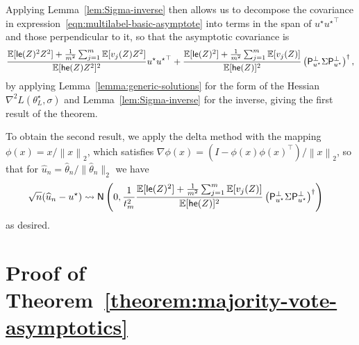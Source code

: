 \documentclass[11pt]{article}
\newcommand{\E}{\mathbb{E}}
\newcommand{\prn}[1]{\left({#1}\right)} %
\newcommand{\norm}[1]{\left\|{#1}\right\|} %
\newcommand{\what}[1]{\widehat{#1}}
\newcommand{\normal}{\mathsf{N}}
\newcommand{\proj}{\mathsf{P}}
\newcommand{\projperp}{\proj_{u\opt}^\perp}
\newcommand{\ltwo}[1]{\norm{#1}_2} %
\newcommand{\norms}[1]{\|{#1}\|} %
\newcommand{\ltwos}[1]{\norms{#1}_2} %
\newcommand{\<}{\langle} %
\renewcommand{\>}{\rangle}
\newcommand{\cd}{\rightsquigarrow}
\newcommand{\opt}{^\star}
\begin{document}
Applying Lemma~\ref{lem:Sigma-inverse} then allows us to decompose the
covariance in expression~\eqref{eqn:multilabel-basic-asymptote} into
terms in the span of $u\opt {u\opt}^\top$ and those perpendicular to
it, so that the asymptotic covariance is
\begin{align*}
	\frac{\E[\linkerr(Z)^2 Z^2] + \frac{1}{m^2}
		\sum_{j = 1}^m \E[v_j(Z) Z^2]}{
		\E[\hessfunc(Z) Z^2]^2} u\opt {u\opt}^\top
	+ \frac{\E[\linkerr(Z)^2] + \frac{1}{m^2}
		\sum_{j = 1}^m \E[v_j(Z)]}{\E[\hessfunc(Z)]^2}
	\prn{\projperp \Sigma \projperp}^\dagger,
\end{align*}
by applying Lemma~\ref{lemma:generic-solutions} for the form of the Hessian
$\nabla^2 L(\theta_L\opt, \sigma)$ and Lemma~\ref{lem:Sigma-inverse} for the
inverse, giving the first result of the theorem.

To obtain the second result, we apply the delta method with
the mapping $\phi(x) = x / \ltwo{x}$, which satisfies
$\nabla \phi(x) = (I - \phi(x) \phi(x)^\top) / \ltwo{x}$,
so that for $\what{u}_n = \what{\theta}_n / \ltwos{\what{\theta}_n}$ we have
\begin{align*}
  \sqrt{n}(\what{u}_n - u\opt)
  & \cd
  \normal\left(0, \frac{1}{t_m^2}
  \frac{\E[\linkerr(Z)^2] + \frac{1}{m^2}
    \sum_{j = 1}^m \E[v_j(Z)]}{\E[\hessfunc(Z)]^2}
  \prn{\projperp \Sigma \projperp}^\dagger
  \right)
\end{align*}
as desired.

\section{Proof of Theorem~\ref{theorem:majority-vote-asymptotics}}
\label{sec:proof-majority-vote-asymptotics}
\end{document}
